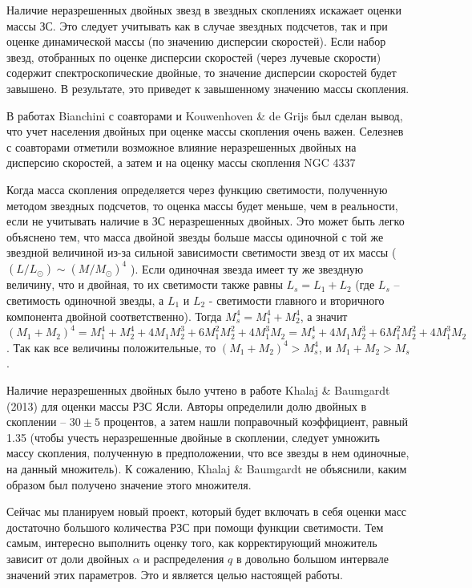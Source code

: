 \documentclass[a4paper,12pt]{article}
\begin{document}
Наличие неразрешенных двойных звезд в звездных скоплениях искажает оценки массы ЗС. Это следует учитывать как в случае звездных подсчетов, так и при оценке динамической массы (по значению дисперсии скоростей). Если набор звезд, отобранных по  оценке дисперсии скоростей (через лучевые скорости) содержит спектроскопические двойные, то значение дисперсии скоростей будет завышено. В результате, это приведет к завышенному значению массы скопления.

В работах Bianchini с соавторами \cite{Bianchini} и Kouwenhoven \& de Grijs \cite{KdeG} был сделан вывод, что учет населения двойных при оценке массы скопления очень важен. Селезнев с соавторами \cite{4337} отметили возможное влияние неразрешенных двойных на дисперсию скоростей, а затем и на оценку массы скопления NGC 4337

Когда масса скопления определяется через функцию светимости, полученную методом звездных подсчетов, то оценка массы будет меньше, чем в реальности, если не учитывать наличие в ЗС неразрешенных двойных. Это может быть легко объяснено тем, что масса двойной звезды больше массы одиночной с той же звездной величиной из-за сильной зависимости светимости звезд от их массы ($(L/L_{\odot})\sim(M/M_{\odot})^4$ \cite{CO}). 
Если одиночная звезда имеет ту же звездную величину, что и двойная, то их светимости также равны $L_s=L_1+L_2$ (где $L_s$ -- светимость одиночной звезды, а  $L_1$ и $L_2$ - светимости главного и вторичного компонента двойной соответственно). Тогда $M_s^4=M_1^4+M_2^4$, а значит $(M_1+M_2)^4=M_1^4+M_2^4+4M_1M_2^3+6M_1^2M_2^2+4M_1^3M_2=M_s^4+4M_1M_2^3+6M_1^2M_2^2+4M_1^3M_2$.
 Так как все величины положительные, то $(M_1+M_2)^4>M_s^4$, и $M_1+M_2>M_s$.
 
 Наличие неразрешенных двойных было учтено в работе Khalaj \& Baumgardt (2013) \cite{Khalaj} для оценки массы РЗС Ясли. Авторы определили долю двойных в скоплении -- $30\pm5$ процентов, а затем нашли поправочный коэффициент, равный 1.35 (чтобы учесть неразрешенные двойные в скоплении, следует умножить массу скопления, полученную в предположении, что все звезды в нем одиночные, на данный множитель). 
К сожалению, Khalaj \& Baumgardt \cite{Khalaj} не объяснили, каким образом был получено значение этого множителя. 

Сейчас мы планируем новый проект, который будет включать в себя оценки масс достаточно большого количества РЗС при помощи функции светимости. Тем самым, интересно выполнить оценку того, как корректирующий множитель зависит от доли двойных $\alpha$ и распределения $q$ в довольно большом интервале значений этих параметров. Это и является целью настоящей работы.
\end{document}
